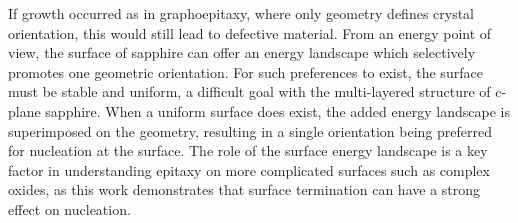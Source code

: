 If growth occurred as in graphoepitaxy, where only geometry defines crystal orientation, this would still lead to defective material.
From an energy point of view, the surface of sapphire can offer an energy landscape which selectively promotes one geometric orientation.
For such preferences to exist, the surface must be stable and uniform, a difficult goal with the multi-layered structure of c-plane sapphire.
When a uniform surface does exist, the added energy landscape is superimposed on the geometry, resulting in a single orientation being preferred for nucleation at the surface.
The role of the surface energy landscape is a key factor in understanding epitaxy on more complicated surfaces such as complex oxides, as this work demonstrates that surface termination can have a strong effect on nucleation.
